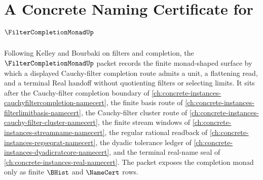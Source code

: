 \chapter{A Concrete Naming Certificate for $\FilterCompletionMonadUp$}
\label{ch:concrete-instances-filter-completion-monad-namecert}

Following Kelley and Bourbaki on filters and completion, the $\FilterCompletionMonadUp$ packet records the finite monad-shaped surface by which a displayed Cauchy-filter completion route admits a unit, a flattening read, and a terminal Real handoff without quotienting filters or selecting limits. It sits after the Cauchy-filter completion boundary of \autoref{ch:concrete-instances-cauchyfiltercompletion-namecert}, the finite basis route of \autoref{ch:concrete-instances-filterlimitbasis-namecert}, the Cauchy-filter cluster route of \autoref{ch:concrete-instances-cauchy-filter-cluster-namecert}, the finite stream windows of \autoref{ch:concrete-instances-streamname-namecert}, the regular rational readback of \autoref{ch:concrete-instances-regseqrat-namecert}, the dyadic tolerance ledger of \autoref{ch:concrete-instances-dyadicratcore-namecert}, and the terminal real-name seal of \autoref{ch:concrete-instances-real-namecert}. The packet exposes the completion monad only as finite $\BHist$ and $\NameCert$ rows.

